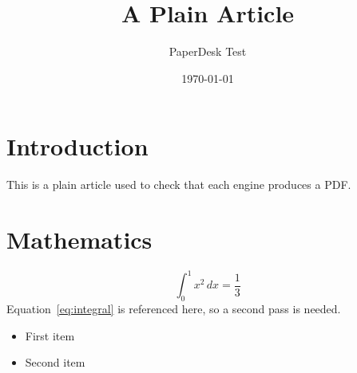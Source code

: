 \documentclass[11pt,a4paper]{article}
\title{A Plain Article}
\author{PaperDesk Test}
\date{\today}
\begin{document}
\maketitle

\section{Introduction}
This is a plain article used to check that each engine produces a PDF.

\section{Mathematics}
\begin{equation}
  \int_0^1 x^2 \, dx = \frac{1}{3}
  \label{eq:integral}
\end{equation}
Equation~\eqref{eq:integral} is referenced here, so a second pass is needed.

\begin{itemize}
  \item First item
  \item Second item
\end{itemize}
\end{document}
